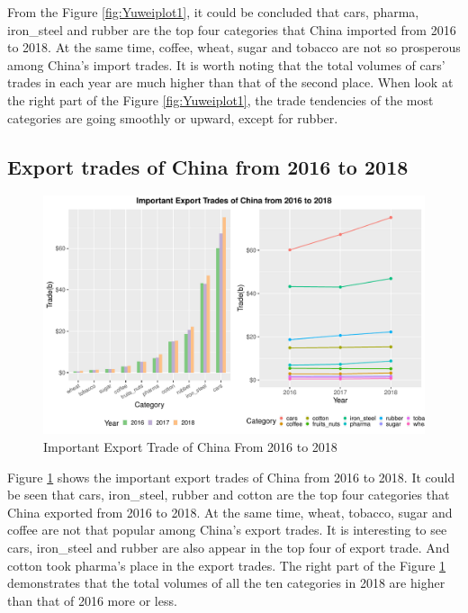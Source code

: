 \documentclass[11pt,a4paper,]{article}
\begin{document}
From the Figure \ref{fig:Yuweiplot1}, it could be concluded that cars, pharma, iron\_steel and rubber are the top four categories that China imported from 2016 to 2018. At the same time, coffee, wheat, sugar and tobacco are not so prosperous among China's import trades. It is worth noting that the total volumes of cars' trades in each year are much higher than that of the second place. When look at the right part of the Figure \ref{fig:Yuweiplot1}, the trade tendencies of the most categories are going smoothly or upward, except for rubber.

\hypertarget{export-trades-of-china-from-2016-to-2018}{%
\subsection{Export trades of China from 2016 to 2018}\label{export-trades-of-china-from-2016-to-2018}}

\begin{figure}[H]
\includegraphics[width=1\linewidth,]{report_files/figure-latex/Yuweiplot2-1} \caption{ Important Export Trade of China From 2016 to 2018}\label{fig:Yuweiplot2}
\end{figure}

Figure \ref{fig:Yuweiplot2} shows the important export trades of China from 2016 to 2018. It could be seen that cars, iron\_steel, rubber and cotton are the top four categories that China exported from 2016 to 2018. At the same time, wheat, tobacco, sugar and coffee are not that popular among China's export trades. It is interesting to see cars, iron\_steel and rubber are also appear in the top four of export trade. And cotton took pharma's place in the export trades. The right part of the Figure \ref{fig:Yuweiplot2} demonstrates that the total volumes of all the ten categories in 2018 are higher than that of 2016 more or less.
\end{document}

